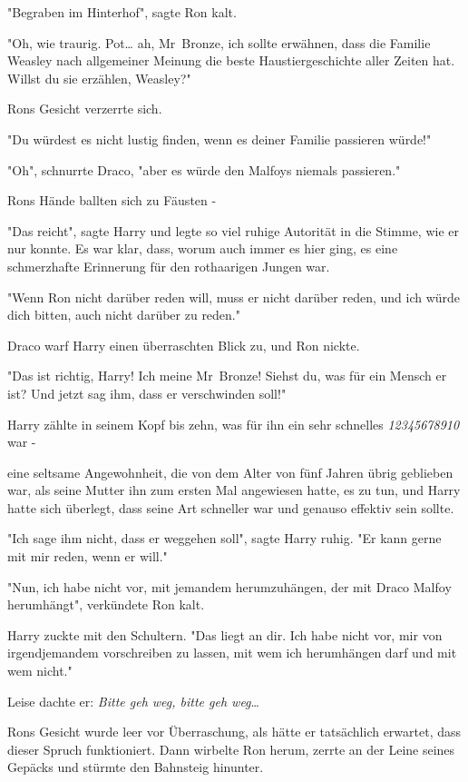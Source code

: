 {"Begraben im Hinterhof", sagte Ron kalt.

"Oh, wie traurig. Pot… ah, Mr~Bronze, ich sollte erwähnen, dass die Familie Weasley nach allgemeiner Meinung die beste Haustiergeschichte aller Zeiten hat. Willst du sie erzählen, Weasley?"

Rons Gesicht verzerrte sich.

"Du würdest es nicht lustig finden, wenn es deiner Familie passieren würde!"

"Oh", schnurrte Draco, "aber es würde den Malfoys niemals passieren."

Rons Hände ballten sich zu Fäusten -

"Das reicht", sagte Harry und legte so viel ruhige Autorität in die Stimme, wie er nur konnte. Es war klar, dass, worum auch immer es hier ging, es eine schmerzhafte Erinnerung für den rothaarigen Jungen war.

"Wenn Ron nicht darüber reden will, muss er nicht darüber reden, und ich würde dich bitten, auch nicht darüber zu reden."

Draco warf Harry einen überraschten Blick zu, und Ron nickte.

"Das ist richtig, Harry! Ich meine Mr~Bronze! Siehst du, was für ein Mensch er ist? Und jetzt sag ihm, dass er verschwinden soll!"

Harry zählte in seinem Kopf bis zehn, was für ihn ein sehr schnelles \emph{12345678910} war -

eine seltsame Angewohnheit, die von dem Alter von fünf Jahren übrig geblieben war, als seine Mutter ihn zum ersten Mal angewiesen hatte, es zu tun, und Harry hatte sich überlegt, dass seine Art schneller war und genauso effektiv sein sollte.

"Ich sage ihm nicht, dass er weggehen soll", sagte Harry ruhig. "Er kann gerne mit mir reden, wenn er will."

"Nun, ich habe nicht vor, mit jemandem herumzuhängen, der mit Draco Malfoy herumhängt", verkündete Ron kalt.

Harry zuckte mit den Schultern. "Das liegt an dir. Ich habe nicht vor, mir von irgendjemandem vorschreiben zu lassen, mit wem ich herumhängen darf und mit wem nicht."

Leise dachte er: \emph{Bitte geh weg, bitte geh weg}…

Rons Gesicht wurde leer vor Überraschung, als hätte er tatsächlich erwartet, dass dieser Spruch funktioniert. Dann wirbelte Ron herum, zerrte an der Leine seines Gepäcks und stürmte den Bahnsteig hinunter.

}

